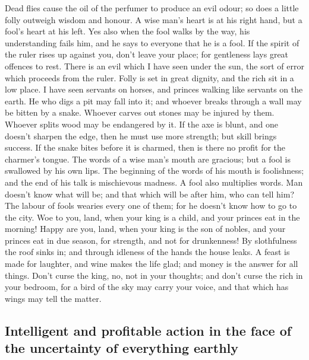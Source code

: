  Dead flies cause the oil of the perfumer to produce an
evil odour; so does a little folly outweigh wisdom and honour.
 A wise man's heart is at his right hand, but a fool's
heart at his left.  Yes also when the fool walks by the
way, his understanding fails him, and he says to everyone that he is a
fool.  If the spirit of the ruler rises up against you,
don't leave your place; for gentleness lays great offences to rest.
 There is an evil which I have seen under the sun, the
sort of error which proceeds from the ruler.  Folly is set
in great dignity, and the rich sit in a low place.  I have
seen servants on horses, and princes walking like servants on the earth.
 He who digs a pit may fall into it; and whoever breaks
through a wall may be bitten by a snake.  Whoever carves
out stones may be injured by them. Whoever splits wood may be endangered
by it.  If the axe is blunt, and one doesn't sharpen the
edge, then he must use more strength; but skill brings success.
 If the snake bites before it is charmed, then is there
no profit for the charmer's tongue.  The words of a wise
man's mouth are gracious; but a fool is swallowed by his own lips.
 The beginning of the words of his mouth is foolishness;
and the end of his talk is mischievous madness.  A fool
also multiplies words. Man doesn't know what will be; and that which
will be after him, who can tell him?  The labour of fools
wearies every one of them; for he doesn't know how to go to the city.
 Woe to you, land, when your king is a child, and your
princes eat in the morning!  Happy are you, land, when
your king is the son of nobles, and your princes eat in due season, for
strength, and not for drunkenness!  By slothfulness the
roof sinks in; and through idleness of the hands the house leaks.
 A feast is made for laughter, and wine makes the life
glad; and money is the answer for all things.  Don't
curse the king, no, not in your thoughts; and don't curse the rich in
your bedroom, for a bird of the sky may carry your voice, and that which
has wings may tell the matter.

\hypertarget{intelligent-and-profitable-action-in-the-face-of-the-uncertainty-of-everything-earthly}{%
\subsection{Intelligent and profitable action in the face of the
uncertainty of everything
earthly}\label{intelligent-and-profitable-action-in-the-face-of-the-uncertainty-of-everything-earthly}}

